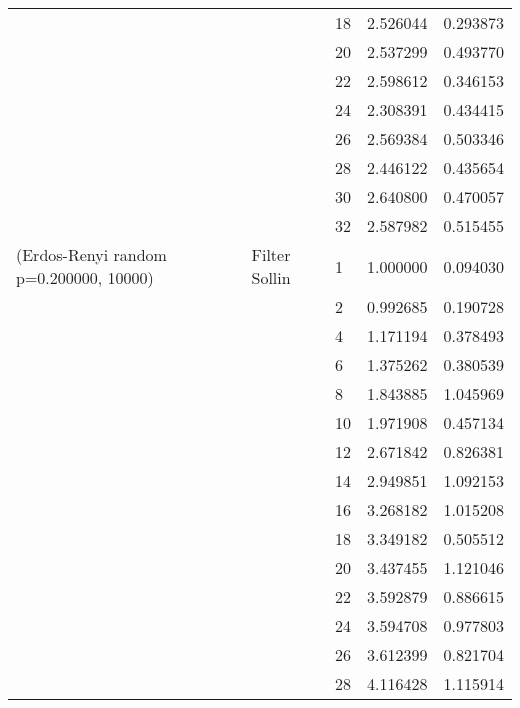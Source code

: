 \begin{tabular}{lllrr}
                      &                     & 18 &  2.526044 &  0.293873 \\
                      &                     & 20 &  2.537299 &  0.493770 \\
                      &                     & 22 &  2.598612 &  0.346153 \\
                      &                     & 24 &  2.308391 &  0.434415 \\
                      &                     & 26 &  2.569384 &  0.503346 \\
                      &                     & 28 &  2.446122 &  0.435654 \\
                      &                     & 30 &  2.640800 &  0.470057 \\
                      &                     & 32 &  2.587982 &  0.515455 \\
(Erdos-Renyi random p=0.200000, 10000) & Filter Sollin & 1  &  1.000000 &  0.094030 \\
                      &                     & 2  &  0.992685 &  0.190728 \\
                      &                     & 4  &  1.171194 &  0.378493 \\
                      &                     & 6  &  1.375262 &  0.380539 \\
                      &                     & 8  &  1.843885 &  1.045969 \\
                      &                     & 10 &  1.971908 &  0.457134 \\
                      &                     & 12 &  2.671842 &  0.826381 \\
                      &                     & 14 &  2.949851 &  1.092153 \\
                      &                     & 16 &  3.268182 &  1.015208 \\
                      &                     & 18 &  3.349182 &  0.505512 \\
                      &                     & 20 &  3.437455 &  1.121046 \\
                      &                     & 22 &  3.592879 &  0.886615 \\
                      &                     & 24 &  3.594708 &  0.977803 \\
                      &                     & 26 &  3.612399 &  0.821704 \\
                      &                     & 28 &  4.116428 &  1.115914 \\

\end{tabular}
